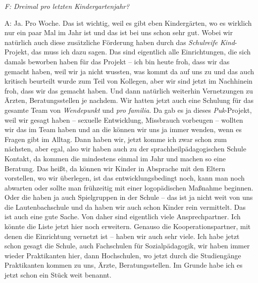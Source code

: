 \emph{F: Dreimal pro letzten Kindergartenjahr?}

A: Ja. Pro Woche. Das ist wichtig, weil es gibt eben Kindergärten, wo es wirklich nur ein paar Mal im Jahr ist und das ist bei uns schon sehr gut. Wobei wir natürlich auch diese zusätzliche Förderung haben durch das \emph{Schulreife Kind}-Projekt, das muss ich dazu sagen. Das sind eigentlich alle Einrichtungen, die sich damals beworben haben für das Projekt -- ich bin heute froh, dass wir das gemacht haben, weil wir ja nicht wussten, was kommt da auf uns zu und das auch kritisch beurteilt wurde zum Teil von Kollegen, aber wir sind jetzt im Nachhinein froh, dass wir das gemacht haben. Und dann natürlich weiterhin Vernetzungen zu Ärzten, Beratungsstellen je nachdem. Wir hatten jetzt auch eine Schulung für das gesamte Team von \emph{Wendepunkt} und \emph{pro familia}. Da gab es ja dieses \emph{Puk}-Projekt, weil wir gesagt haben -- sexuelle Entwicklung, Missbrauch vorbeugen -- wollten wir das im Team haben und an die können wir uns ja immer wenden, wenn es Fragen gibt im Alltag. Dann haben wir, jetzt komme ich zwar schon zum nächsten, aber egal, also wir haben auch zu der sprachheilpädagogischen Schule Kontakt, da kommen die mindestens einmal im Jahr und machen so eine Beratung. Das heißt, da können wir Kinder in Absprache mit den Eltern vorstellen, wo wir überlegen, ist das entwicklungsbedingt noch, kann man noch abwarten oder sollte man frühzeitig mit einer logopädischen Maßnahme beginnen. Oder die haben ja auch Spielgruppen in der Schule -- das ist ja nicht weit von uns die Lautenbachschule und da haben wir auch schon Kinder rein vermittelt. Das ist auch eine gute Sache. Von daher sind eigentlich viele Ansprechpartner. Ich könnte die Liste jetzt hier noch erweitern. Genauso die Kooperationspartner, mit denen die Einrichtung vernetzt ist -- haben wir auch sehr viele. Ich habe jetzt schon gesagt die Schule, auch Fachschulen für Sozialpädagogik, wir haben immer wieder Praktikanten hier, dann Hochschulen, wo jetzt durch die Studiengänge Praktikanten kommen zu uns, Ärzte, Beratungsstellen. Im Grunde habe ich es jetzt schon ein Stück weit benannt.

